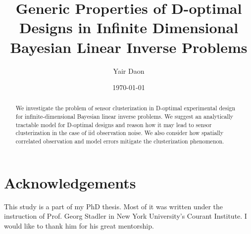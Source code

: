 \documentclass{amsart}
\numberwithin{equation}{section}
\begin{document}
\title[Generic Properties of D-optimal Designs]{Generic Properties of D-optimal
  Designs in Infinite Dimensional Bayesian Linear Inverse Problems}

\author{Yair Daon}
\address{Porter School of the Environment and Earth
  Sciences, Tel Aviv University\\ Tel Aviv, Israel}

\date{\today}

\begin{abstract}
  We investigate the problem of sensor clusterization in D-optimal
  experimental design for infinite-dimensional Bayesian linear inverse
  problems. We suggest an analytically tractable model for D-optimal
  designs and reason how it may lead to sensor clusterization in the
  case of iid observation noise. We also consider how spatially
  correlated observation and model errors mitigate the clusterization
  phenomenon.

\end{abstract}

\maketitle









\section{Acknowledgements}
This study is a part of my PhD thesis. Most of it was written under
the instruction of Prof. Georg Stadler in New York University's
Courant Institute. I would like to thank him for his great
mentorship.
\end{document}
